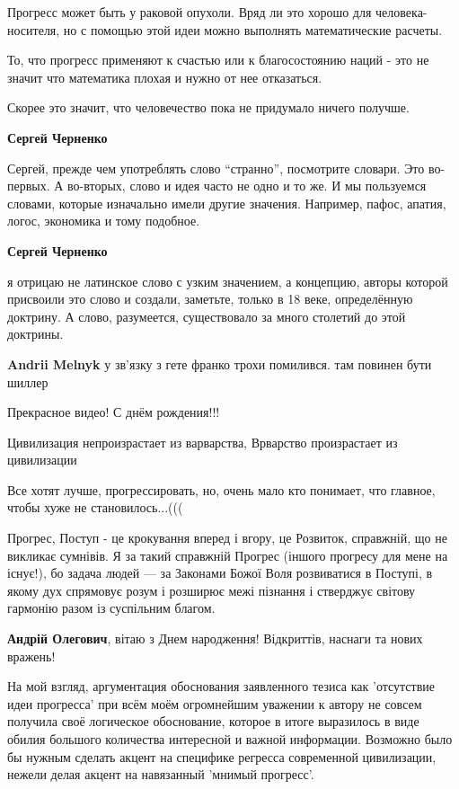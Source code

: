 \begin{itemize}
\begin{itemize}
Прогресс может быть у раковой опухоли. Вряд ли это хорошо для
человека-носителя, но с помощью этой идеи можно выполнять математические
расчеты.

То, что прогресс применяют к счастью или к благосостоянию наций - это не значит
что математика плохая и нужно от нее отказаться.

Скорее это значит, что человечество пока не придумало ничего получше.

\textbf{Сергей Черненко} 

Сергей, прежде чем употреблять слово \enquote{странно}, посмотрите словари. Это
во-первых. А во-вторых, слово и идея часто не одно и то же. И мы пользуемся
словами, которые изначально имели другие значения. Например, пафос, апатия,
логос, экономика и тому подобное.

\textbf{Сергей Черненко} 

я отрицаю не латинское слово с узким значением, а концепцию, авторы которой
присвоили это слово и создали, заметьте, только в 18 веке, определённую
доктрину. А слово, разумеется, существовало за много столетий до этой доктрины.

\textbf{Andrii Melnyk} у зв'язку з гете франко трохи помилився. там повинен бути шиллер
\end{itemize} %

Прекрасное видео! С днём рождения!!!

Цивилизация непроизрастает из варварства, Врварство произрастает из цивилизации


Все хотят лучше, прогрессировать, но, очень мало кто понимает, что главное,
чтобы хуже не становилось...(((


Прогрес, Поступ - це крокування вперед і вгору, це Розвиток, справжній, що не
викликає сумнівів. Я за такий справжній Прогрес (іншого прогресу для мене на
існує!), бо задача людей — за Законами Божої Воля розвиватися в Поступі, в
якому дух спрямовує розум і розширює межі пізнання і стверджує світову гармонію
разом із суспільним благом.

\textbf{Андрій Олегович}, вітаю з Днем народження! Відкриттів, наснаги та нових вражень!


На мой взгляд, аргументация обоснования заявленного тезиса как 'отсутствие идеи
прогресса' при всём моём огромнейшим уважении к автору не совсем получила своё
логическое обоснование, которое в итоге выразилось в виде обилия большого
количества интересной и важной информации. Возможно было бы нужным сделать
акцент на специфике регресса современной цивилизации, нежели делая акцент на
навязанный 'мнимый прогресс'.


\end{itemize}

